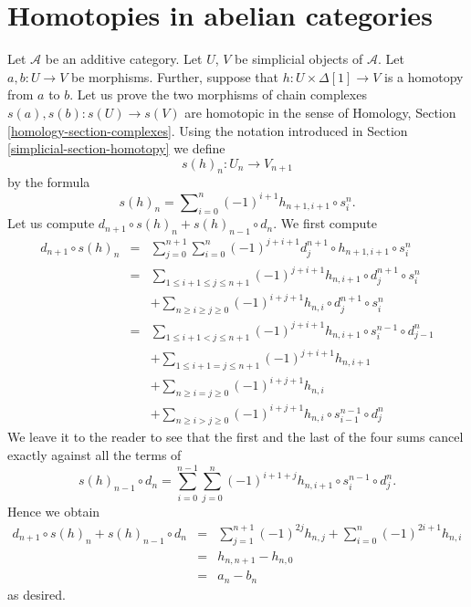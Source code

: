 \section{Homotopies in abelian categories}
\label{simplicial-section-homotopy-abelian}
Let $\mathcal{A}$ be an additive category. Let $U$, $V$ be simplicial objects
of $\mathcal{A}$. Let $a, b : U \to V$ be morphisms. Further, suppose that
$h : U \times \Delta[1] \to V$ is a homotopy from $a$ to $b$. Let us prove
the two morphisms of chain complexes $s(a), s(b) : s(U) \longrightarrow s(V)$
are homotopic in the sense of
Homology, Section \ref{homology-section-complexes}.
Using the notation introduced in Section \ref{simplicial-section-homotopy}
we define
$$
s(h)_n : U_n \longrightarrow V_{n + 1}
$$
by the formula
\begin{equation}
\label{equation-homotopy-to-homotopy}
s(h)_n = \sum\nolimits_{i = 0}^n (-1)^{i + 1} h_{n + 1, i + 1} \circ s^n_i.
\end{equation}
Let us compute $d_{n + 1} \circ s(h)_n + s(h)_{n - 1} \circ d_n$.
We first compute
\begin{eqnarray*}
d_{n + 1} \circ s(h)_n & = &
\sum\nolimits_{j = 0}^{n + 1}
\sum\nolimits_{i = 0}^n
(-1)^{j + i + 1}
d^{n + 1}_j \circ h_{n + 1, i + 1} \circ s^n_i \\
& = &
\sum\nolimits_{1 \leq i + 1 \leq j \leq n + 1}
(-1)^{j + i + 1}
h_{n, i + 1} \circ d^{n + 1}_j \circ s^n_i \\
& &
+
\sum\nolimits_{n \geq i \geq j \geq 0}
(-1)^{i + j + 1}
h_{n, i} \circ d^{n + 1}_j \circ s^n_i \\
& = &
\sum\nolimits_{1 \leq i + 1 < j \leq n + 1}
(-1)^{j + i + 1}
h_{n, i + 1} \circ s^{n - 1}_i \circ d^n_{j - 1} \\
& &
+
\sum\nolimits_{1 \leq i + 1 = j \leq n + 1}
(-1)^{j + i + 1}
h_{n, i + 1} \\
& &
+
\sum\nolimits_{n \geq i = j \geq 0}
(-1)^{i + j + 1}
h_{n, i} \\
& &
+
\sum\nolimits_{n \geq i > j \geq 0}
(-1)^{i + j + 1}
h_{n, i} \circ s^{n - 1}_{i - 1} \circ d^n_j
\end{eqnarray*}
We leave it to the reader to see that the first and the last
of the four sums cancel exactly against all the terms of
$$
s(h)_{n - 1} \circ d_n
=
\sum_{i = 0}^{n - 1} \sum_{j = 0}^n
(-1)^{i + 1 + j} h_{n, i + 1} \circ s^{n - 1}_i \circ d^n_j.
$$
Hence we obtain
\begin{eqnarray*}
d_{n + 1} \circ s(h)_n + s(h)_{n - 1} \circ d_n
& = &
\sum_{j = 1}^{n + 1} (-1)^{2j} h_{n, j}
+
\sum_{i = 0}^n (-1)^{2i + 1} h_{n, i} \\
& = &
h_{n, n + 1} - h_{n , 0} \\
& = &
a_n - b_n
\end{eqnarray*}
as desired.

